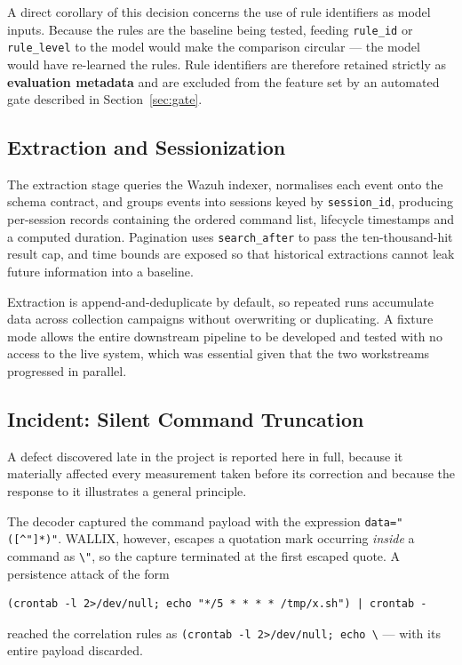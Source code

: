 \documentclass{classeENS}
\begin{document}
A direct corollary of this decision concerns the use of rule identifiers as model inputs. Because the rules are the baseline being tested, feeding \texttt{rule\_id} or \texttt{rule\_level} to the model would make the comparison circular --- the model would have re-learned the rules. Rule identifiers are therefore retained strictly as \textbf{evaluation metadata} and are excluded from the feature set by an automated gate described in Section~\ref{sec:gate}.

\subsection{Extraction and Sessionization}
The extraction stage queries the Wazuh indexer, normalises each event onto the schema contract, and groups events into sessions keyed by \texttt{session\_id}, producing per-session records containing the ordered command list, lifecycle timestamps and a computed duration. Pagination uses \texttt{search\_after} to pass the ten-thousand-hit result cap, and time bounds are exposed so that historical extractions cannot leak future information into a baseline.

Extraction is append-and-deduplicate by default, so repeated runs accumulate data across collection campaigns without overwriting or duplicating. A fixture mode allows the entire downstream pipeline to be developed and tested with no access to the live system, which was essential given that the two workstreams progressed in parallel.

\subsection{Incident: Silent Command Truncation}
\label{sec:truncation}
A defect discovered late in the project is reported here in full, because it materially affected every measurement taken before its correction and because the response to it illustrates a general principle.

The decoder captured the command payload with the expression \texttt{data="([\^{}"]*)"}. WALLIX, however, escapes a quotation mark occurring \emph{inside} a command as \verb|\"|, so the capture terminated at the first escaped quote. A persistence attack of the form

\begin{verbatim}
(crontab -l 2>/dev/null; echo "*/5 * * * * /tmp/x.sh") | crontab -
\end{verbatim}

reached the correlation rules as \verb|(crontab -l 2>/dev/null; echo \| --- with its entire payload discarded.
\end{document}
